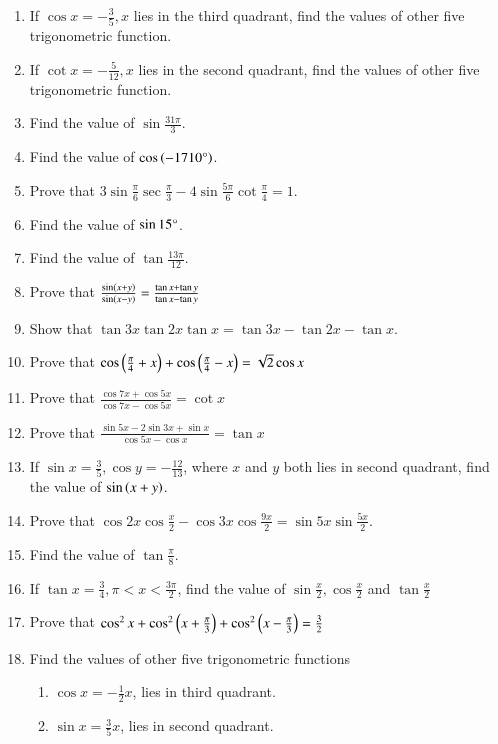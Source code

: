 \begin{enumerate}[label=\thesubsection.\arabic*.,ref=\thesubsection.\theenumi,itemsep=1ex]
%
\item If $\cos x = -\frac{3}{5}, x$ lies in the third quadrant, find the values of other five trigonometric function.
%
\item If $\cot x = - \frac{5}{12}, x$ lies in the second quadrant, find the values of other five trigonometric function.
%
\item Find the value of $\sin \frac{31\pi}{3}$.
%
\item Find the value of $\cos\left(-1710\degree\right)$.
%
\item Prove that $3\sin\frac{\pi}{6}\sec\frac{\pi}{3}-4\sin\frac{5\pi}{6}\cot\frac{\pi}{4} = 1.$
%
\item Find the value of $\sin 15\degree$.
%
\item Find the value of $\tan\frac{13\pi}{12}$.
%
%
\item Prove that $\frac{\sin\left(x+y\right)}{\sin\left(x-y\right)} = \frac{\tan x + \tan y}{\tan x - \tan y}$
%
%
\item Show that
$\tan3x\tan2x\tan x = \tan3x-\tan2x-\tan x$.
%
%
\item Prove that
$\cos\left(\frac{\pi}{4}+x\right) + \cos\left(\frac{\pi}{4}-x\right) = \sqrt 2\cos x$
%
%
\item Prove that $\frac{\cos7x+\cos5x}{\cos7x-\cos5x} = \cot x$
%
%
\item Prove that $\frac{\sin5x-2\sin3x+\sin x}{\cos5x-\cos x} = \tan x$
%
%
\item If $\sin x=\frac{3}{5}, \cos y=-\frac{12}{13}$, where $x$ and $y$
both lies in second quadrant, find the value of
$\sin\left(x+y\right)$.
%
%
\item Prove that
$\cos2x\cos\frac{x}{2}-\cos3x\cos\frac{9x}{2}=\sin5x\sin\frac{5x}{2}$.
%
%
\item Find the value of $\tan\frac{\pi}{8}$.
%
%
\item If $\tan x=\frac{3}{4}, \pi<x<\frac{3\pi}{2}$, find the value of $\sin\frac{x}{2},\cos\frac{x}{2}$ and $\tan\frac{x}{2}$
%
%
\item Prove that
$\cos^{2}x+\cos^{2}\left(x+\frac{\pi}{3}\right)+\cos^{2}\left(x-\frac{\pi}{3}\right)=\frac{3}{2}$
%
\item Find the values of other five trigonometric functions 
\begin{enumerate}
	\item $\cos x=-\frac{1}{2}x$,  lies in third quadrant.
	\item $\sin x= \frac{3}{5}x$,  lies in second quadrant.

\end{enumerate}
\end{enumerate}

